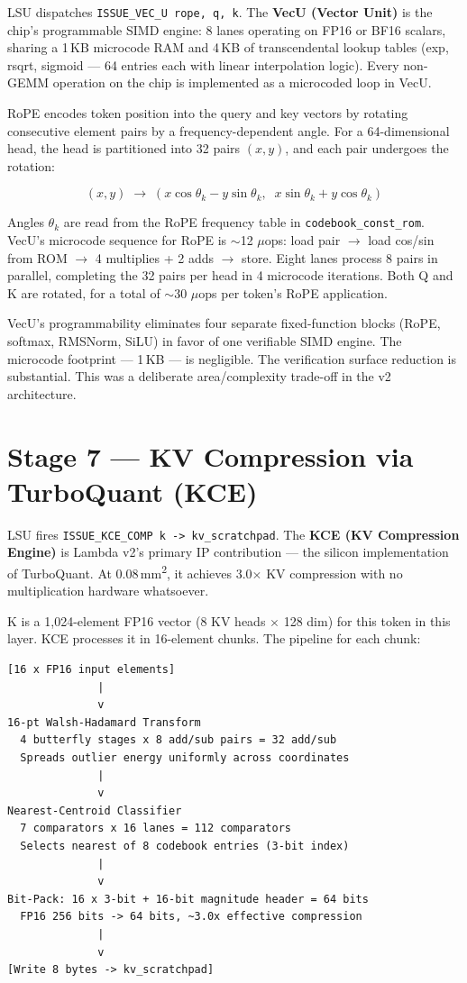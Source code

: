 \documentclass[11pt,letterpaper]{article}
\begin{document}
LSU dispatches \texttt{ISSUE\_VEC\_U rope, q, k}. The \textbf{VecU (Vector Unit)} is the
chip's programmable SIMD engine: 8 lanes operating on FP16 or BF16 scalars, sharing a 1\,KB
microcode RAM and 4\,KB of transcendental lookup tables (exp, rsqrt, sigmoid --- 64 entries
each with linear interpolation logic). Every non-GEMM operation on the chip is implemented as
a microcoded loop in VecU.

RoPE encodes token position into the query and key vectors by rotating consecutive element
pairs by a frequency-dependent angle. For a 64-dimensional head, the head is partitioned into
32 pairs $(x, y)$, and each pair undergoes the rotation:

\begin{equation*}
(x, y) \;\to\; (x\cos\theta_k - y\sin\theta_k,\;\; x\sin\theta_k + y\cos\theta_k)
\end{equation*}

Angles $\theta_k$ are read from the RoPE frequency table in \texttt{codebook\_const\_rom}.
VecU's microcode sequence for RoPE is $\sim$12 $\mu$ops: load pair $\to$ load cos/sin from
ROM $\to$ 4 multiplies + 2 adds $\to$ store. Eight lanes process 8 pairs in parallel,
completing the 32 pairs per head in 4 microcode iterations. Both Q and K are rotated, for a
total of $\sim$30 $\mu$ops per token's RoPE application.

VecU's programmability eliminates four separate fixed-function blocks (RoPE, softmax,
RMSNorm, SiLU) in favor of one verifiable SIMD engine. The microcode footprint --- 1\,KB ---
is negligible. The verification surface reduction is substantial. This was a deliberate
area/complexity trade-off in the v2 architecture.

\section{Stage 7 --- KV Compression via TurboQuant (KCE)}

LSU fires \texttt{ISSUE\_KCE\_COMP k -> kv\_scratchpad}. The \textbf{KCE (KV Compression
Engine)} is Lambda v2's primary IP contribution --- the silicon implementation of TurboQuant.
At 0.08\,mm\textsuperscript{2}, it achieves 3.0$\times$ KV compression with no multiplication hardware whatsoever.

K is a 1{,}024-element FP16 vector (8 KV heads $\times$ 128 dim) for this token in this
layer. KCE processes it in 16-element chunks. The pipeline for each chunk:

\begin{lstlisting}
[16 x FP16 input elements]
              |
              v
16-pt Walsh-Hadamard Transform
  4 butterfly stages x 8 add/sub pairs = 32 add/sub
  Spreads outlier energy uniformly across coordinates
              |
              v
Nearest-Centroid Classifier
  7 comparators x 16 lanes = 112 comparators
  Selects nearest of 8 codebook entries (3-bit index)
              |
              v
Bit-Pack: 16 x 3-bit + 16-bit magnitude header = 64 bits
  FP16 256 bits -> 64 bits, ~3.0x effective compression
              |
              v
[Write 8 bytes -> kv_scratchpad]
\end{lstlisting}
\end{document}
